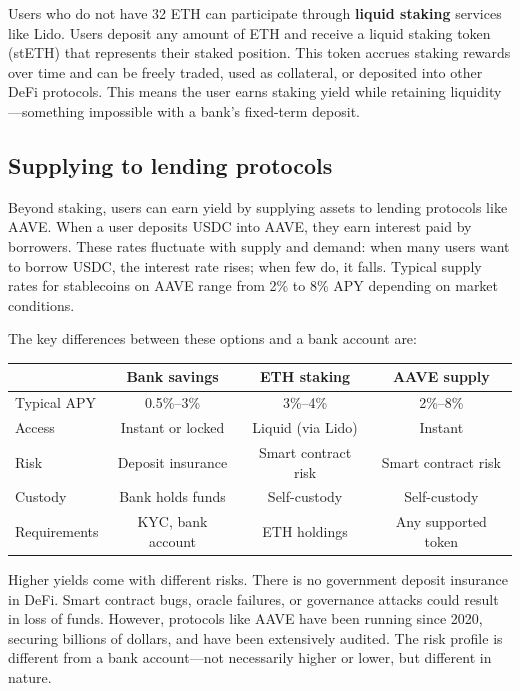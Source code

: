 Users who do not have 32 ETH can participate through \textbf{liquid staking} services like Lido. Users deposit any amount of ETH and receive a liquid staking token (stETH) that represents their staked position. This token accrues staking rewards over time and can be freely traded, used as collateral, or deposited into other DeFi protocols. This means the user earns staking yield while retaining liquidity---something impossible with a bank's fixed-term deposit.

\subsection{Supplying to lending protocols}

Beyond staking, users can earn yield by supplying assets to lending protocols like AAVE. When a user deposits USDC into AAVE, they earn interest paid by borrowers. These rates fluctuate with supply and demand: when many users want to borrow USDC, the interest rate rises; when few do, it falls. Typical supply rates for stablecoins on AAVE range from 2\% to 8\% APY depending on market conditions.

The key differences between these options and a bank account are:

\begin{center}
\begin{tabular}{l c c c}
\hline
& \textbf{Bank savings} & \textbf{ETH staking} & \textbf{AAVE supply} \\
\hline
Typical APY & 0.5\%--3\% & 3\%--4\% & 2\%--8\% \\
Access & Instant or locked & Liquid (via Lido) & Instant \\
Risk & Deposit insurance & Smart contract risk & Smart contract risk \\
Custody & Bank holds funds & Self-custody & Self-custody \\
Requirements & KYC, bank account & ETH holdings & Any supported token \\
\hline
\end{tabular}
\end{center}

Higher yields come with different risks. There is no government deposit insurance in DeFi. Smart contract bugs, oracle failures, or governance attacks could result in loss of funds. However, protocols like AAVE have been running since 2020, securing billions of dollars, and have been extensively audited. The risk profile is different from a bank account---not necessarily higher or lower, but different in nature.

